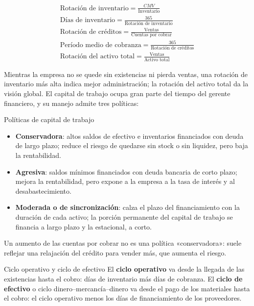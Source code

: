 \begin{formulaBox}
\[
\begin{gathered}
\text{Rotación de inventario} = \frac{CMV}{\text{Inventario}}
\\[4pt]
\text{Días de inventario} = \frac{365}{\text{Rotación de inventario}}
\\[4pt]
\text{Rotación de créditos} = \frac{\text{Ventas}}{\text{Cuentas por cobrar}}
\\[4pt]
\text{Período medio de cobranza} = \frac{365}{\text{Rotación de créditos}}
\\[4pt]
\text{Rotación del activo total} = \frac{\text{Ventas}}{\text{Activo total}}
\end{gathered}
\]
\end{formulaBox}

Mientras la empresa no se quede sin existencias ni pierda ventas, una rotación de inventario más alta indica mejor administración; la rotación del activo total da la visión global. El capital de trabajo ocupa gran parte del tiempo del gerente financiero, y su manejo admite tres políticas:

\begin{definicion}{Políticas de capital de trabajo}
\begin{itemize}
\item \textbf{Conservadora}: altos saldos de efectivo e inventarios financiados con deuda de largo plazo; reduce el riesgo de quedarse sin stock o sin liquidez, pero baja la rentabilidad.
\item \textbf{Agresiva}: saldos mínimos financiados con deuda bancaria de corto plazo; mejora la rentabilidad, pero expone a la empresa a la tasa de interés y al desabastecimiento.
\item \textbf{Moderada o de sincronización}: calza el plazo del financiamiento con la duración de cada activo; la porción permanente del capital de trabajo se financia a largo plazo y la estacional, a corto.
\end{itemize}
Un aumento de las cuentas por cobrar no es una política «conservadora»: suele reflejar una relajación del crédito para vender más, que aumenta el riesgo.
\end{definicion}

\begin{definicion}{Ciclo operativo y ciclo de efectivo}
El \textbf{ciclo operativo} va desde la llegada de las existencias hasta el cobro: días de inventario más días de cobranza. El \textbf{ciclo de efectivo} o ciclo dinero–mercancía–dinero va desde el pago de los materiales hasta el cobro: el ciclo operativo menos los días de financiamiento de los proveedores.
\end{definicion}

